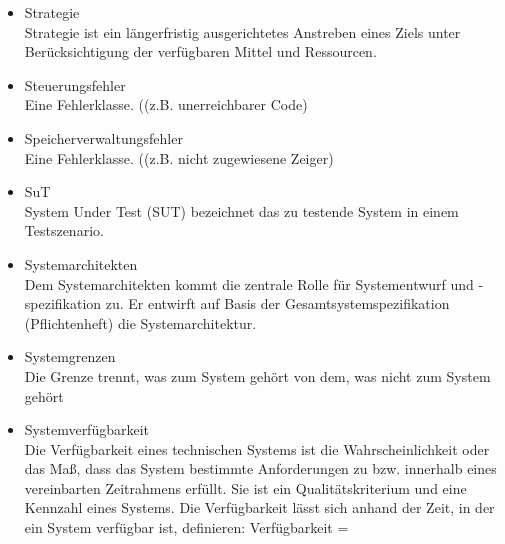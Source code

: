 \begin{itemize}
\item 	Strategie\\
Strategie ist ein längerfristig ausgerichtetes Anstreben eines Ziels unter Berücksichtigung der verfügbaren Mittel und Ressourcen.
\item Steuerungsfehler \\ Eine Fehlerklasse. ((z.B. unerreichbarer Code)
\item Speicherverwaltungsfehler \\ Eine Fehlerklasse. ((z.B. nicht zugewiesene Zeiger)
\item 	SuT\\System Under Test (SUT) bezeichnet das zu testende System in einem Testszenario.
\item 	Systemarchitekten\\Dem Systemarchitekten kommt die zentrale Rolle für Systementwurf und -spezifikation zu. Er entwirft auf Basis der Gesamtsystemspezifikation (Pflichtenheft) die Systemarchitektur.
\item 	Systemgrenzen\\Die Grenze trennt, was zum System gehört von dem, was nicht zum System gehört
\item 	Systemverfügbarkeit \\Die Verfügbarkeit eines technischen Systems ist die Wahrscheinlichkeit oder das Maß, dass das System bestimmte Anforderungen zu bzw. innerhalb eines vereinbarten Zeitrahmens erfüllt. Sie ist ein Qualitätskriterium und eine Kennzahl eines Systems. Die Verfügbarkeit lässt sich anhand der Zeit, in der ein System verfügbar ist, definieren:
\mbox{Verfügbarkeit} = 


\end{itemize}

